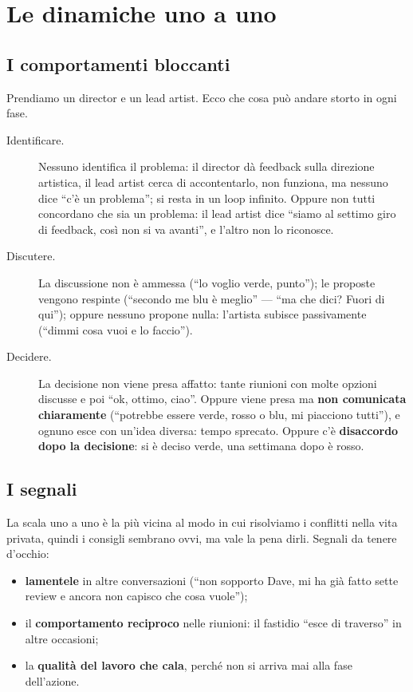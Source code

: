 \section{Le dinamiche uno a uno}
\label{sec:c3-3-uno-a-uno}

\subsection{I comportamenti bloccanti}

Prendiamo un director e un lead artist. Ecco che cosa può andare storto in ogni
fase.
\begin{description}
  \item[Identificare.] Nessuno identifica il problema: il director dà feedback
        sulla direzione artistica, il lead artist cerca di accontentarlo, non
        funziona, ma nessuno dice ``c'è un problema''; si resta in un loop
        infinito. Oppure non tutti concordano che sia un problema: il lead artist
        dice ``siamo al settimo giro di feedback, così non si va avanti'', e l'altro
        non lo riconosce.
  \item[Discutere.] La discussione non è ammessa (``lo voglio verde, punto''); le
        proposte vengono respinte (``secondo me blu è meglio'' --- ``ma che dici?
        Fuori di qui''); oppure nessuno propone nulla: l'artista subisce
        passivamente (``dimmi cosa vuoi e lo faccio'').
  \item[Decidere.] La decisione non viene presa affatto: tante riunioni con molte
        opzioni discusse e poi ``ok, ottimo, ciao''. Oppure viene presa ma
        \textbf{non comunicata chiaramente} (``potrebbe essere verde, rosso o blu,
        mi piacciono tutti''), e ognuno esce con un'idea diversa: tempo sprecato.
        Oppure c'è \textbf{disaccordo dopo la decisione}: si è deciso verde, una
        settimana dopo è rosso.
\end{description}

\subsection{I segnali}

La scala uno a uno è la più vicina al modo in cui risolviamo i conflitti nella vita
privata, quindi i consigli sembrano ovvi, ma vale la pena dirli. Segnali da tenere
d'occhio:
\begin{itemize}
  \item \textbf{lamentele} in altre conversazioni (``non sopporto Dave, mi ha già
        fatto sette review e ancora non capisco che cosa vuole'');
  \item il \textbf{comportamento reciproco} nelle riunioni: il fastidio ``esce di
        traverso'' in altre occasioni;
  \item la \textbf{qualità del lavoro che cala}, perché non si arriva mai alla fase
        dell'azione.
\end{itemize}


